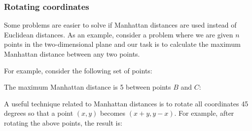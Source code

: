 \subsubsection{Rotating coordinates}

Some problems are easier to solve if
Manhattan distances are used instead of Euclidean distances.
As an example, consider a problem where we are given
$n$ points in the two-dimensional plane
and our task is to calculate the maximum Manhattan
distance between any two points.

For example, consider the following set of points:
\begin{center}
\end{center}
The maximum Manhattan distance is 5
between points $B$ and $C$:
\begin{center}
\end{center}

A useful technique related to Manhattan distances
is to rotate all coordinates 45 degrees so that
a point $(x,y)$ becomes $(x+y,y-x)$.
For example, after rotating the above points,
the result is:

